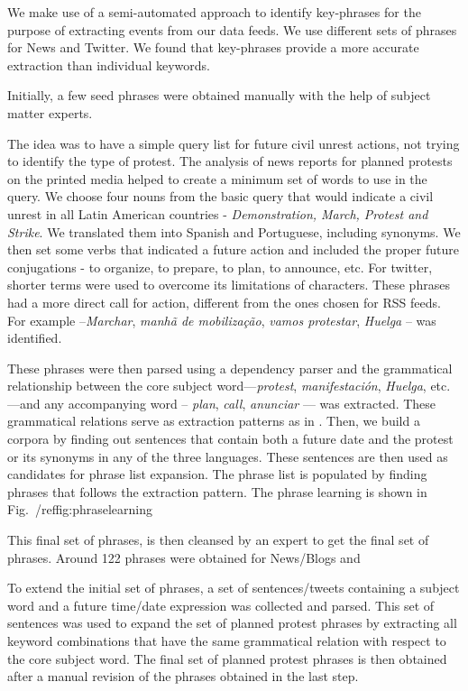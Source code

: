 We make use of a semi-automated approach to identify key-phrases for the purpose of extracting events from our data feeds. We use different sets of phrases for News and Twitter. We found that key-phrases provide a more accurate extraction than individual keywords.

Initially, a few seed phrases were obtained manually
with the help of subject matter experts. 


The idea was to have a simple query list for future civil unrest actions, not trying to identify the type of protest. The analysis of news reports for planned protests on the printed media helped to create a minimum set of words to use in the query.
We choose four nouns from the basic query that would indicate a civil unrest in all Latin American countries - {\em Demonstration, March, Protest and Strike}. We translated them into Spanish and Portuguese, including synonyms.
We then set some verbs that indicated a future action and included the proper future conjugations - to organize, to prepare, to plan, to announce, etc. For twitter, shorter terms were used to overcome its limitations of characters. These phrases had a more direct call for action, different from the ones chosen for RSS feeds. For example --{\em Marchar}, {\em manhã de mobilização}, {\em vamos  protestar}, {\em Huelga} -- was identified.

These phrases were then parsed
using a dependency parser and the grammatical relationship between the
core subject word---{\em protest}, {\em manifestación}, {\em Huelga},
etc.---and any accompanying word -- {\em plan}, {\em call}, {\em anunciar} --- was extracted. These grammatical relations serve as extraction patterns as in \cite{riloff2003learning}. Then, we build a corpora by finding out sentences that contain both a future date and the protest or its synonyms in any of the three languages. These sentences are then used as candidates for phrase list expansion. The phrase list is populated by finding phrases that follows the extraction pattern.
The phrase learning is shown in Fig.~/ref{fig:phraselearning}

This final set of phrases, is then cleansed by an expert to get the final set of phrases. Around 122 phrases were obtained for News/Blogs and 

To extend the initial set of phrases, a set of sentences/tweets containing a subject word and a
future time/date expression was collected and parsed.  This set of
sentences was used to expand the set of planned protest phrases by
extracting all keyword combinations that have the same grammatical
relation with respect to the core subject word. The final set of
planned protest phrases is then obtained after a manual revision of
the phrases obtained in the last step.

